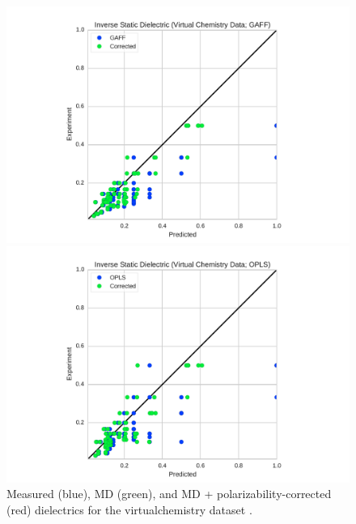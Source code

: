 \documentclass[journal=jacsat,manuscript=article]{achemso}
\begin{document}
\begin{figure}

\includegraphics[width=\columnwidth]{./figures/dielectric_virtual_chemistry_gaff.pdf}

\includegraphics[width=\columnwidth]{./figures/dielectric_virtual_chemistry_opls.pdf}


\caption{Measured (blue), MD (green), and MD + polarizability-corrected (red) dielectrics for the virtualchemistry dataset \cite{caleman2011force, van2012gromacs}.  
}
\label{figure:VirtualChemistry}
\end{figure}


\end{document}
